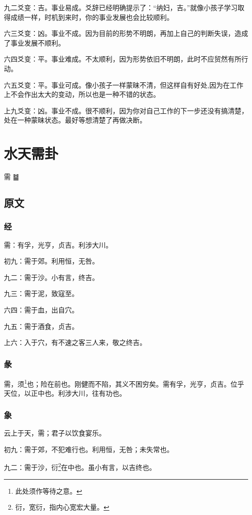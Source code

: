 \documentclass[12pt,oneside]{book}
\begin{document}
九二爻变：吉。事业易成。爻辞已经明确提示了：“纳妇，吉。”就像小孩子学习取得成绩一样，时机到来时，你的事业发展也会比较顺利。

六三爻变：凶。事业不成。因为目前的形势不明朗，再加上自己的判断失误，造成了事业发展不顺利。

六四爻变：平。事业难成。不太顺利，因为形势依旧不明朗，此时不应贸然有所行动。

六五爻变：平。事业可成。像小孩子一样蒙昧不清，但这样自有好处,因为在工作上不会作出太大的变动，所以也是一种不错的状态。

上九爻变：凶。事业不成。很不顺利，因为你对自己工作的下一步还没有搞清楚，处在一种蒙昧状态。最好等想清楚了再做决断。


\chapter{水天需卦}
需 {\Large ䷄}

\section{原文}

\subsection{经}
需：有孚，光亨，贞吉。利涉大川。

初九：需于郊。利用恒，无咎。

九二：需于沙。小有言，终吉。

九三：需于泥，致寇至。

六四：需于血，出自穴。

九五：需于酒食，贞吉。

上六：入于穴，有不速之客三人来，敬之终吉。

\subsection{彖}
需，须\footnote{此处须作等待之意。}也；险在前也。刚健而不陷，其义不困穷矣。需有孚，光亨，贞吉。位乎天位，以正中也。利涉大川，往有功也。

\subsection{象}
云上于天，需；君子以饮食宴乐。

初九：需于郊，不犯难行也。利用恒，无咎；未失常也。

九二：需于沙，衍\footnote{衍，宽衍，指内心宽宏大量。}在中也。虽小有言，以吉终也。
\end{document}
